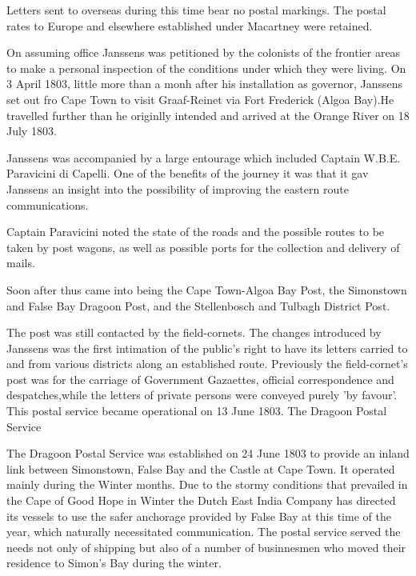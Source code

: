 Letters sent to overseas during this time bear no postal markings. 
The postal rates to Europe and elsewhere established under Macartney 
were retained.


On assuming office Janssens was petitioned by the colonists of the frontier areas to make a personal inspection of the conditions under which they were living. On 3 April 1803, little more than a monh after his installation as governor, Janssens set out fro Cape Town to visit Graaf-Reinet via Fort Frederick (Algoa Bay).He travelled further than he originlly intended and arrived at the Orange River on 18 July 1803.

Janssens was accompanied by a large entourage which included Captain W.B.E. Paravicini di Capelli. One of the benefits of the journey it was that it gav Janssens an insight into the possibility of improving the eastern route communications.

Captain Paravicini noted the state of the roads and the possible routes to be taken by post wagons, as well as possible ports for the collection and delivery of mails.

Soon after thus came into being the Cape Town-Algoa Bay Post, the Simonstown and False Bay Dragoon Post, and the Stellenbosch and Tulbagh District Post.

The post was still contacted by the field-cornets. The changes introduced by Janssens was the first intimation of the public's right to have its letters carried to and from various districts along an established route. Previously the field-cornet's post was for the carriage of Government Gazaettes, official correspondence and despatches,while the letters of private persons were conveyed purely 'by favour'. This postal service became operational on 13 June 1803.
The Dragoon Postal Service

The Dragoon Postal Service was established on 24 June 1803 to provide an inland link between Simonstown, False Bay and the Castle at Cape Town. It operated mainly during the Winter months. Due to the stormy conditions that prevailed in the Cape of Good Hope in Winter the Dutch East India Company has directed its vessels to use the safer anchorage provided by False Bay at this time of the year, which naturally necessitated communication. The postal service served the needs not only of shipping but also of a number of businnesmen who moved their residence to Simon's Bay during the winter.

